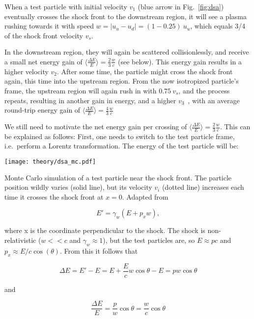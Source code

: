 When a test particle with initial velocity $v_1$ (blue arrow in Fig.~\ref{fig:dsa}) eventually crosses the shock front to the downstream region, it will see a plasma rushing towards it with speed $w=|u_u-u_d| = (1-0.25)~u_u$, which equals 3/4 of the shock front velocity $v_s$.

In the downstream region, they will again be scattered collisionlessly, and receive a small net energy gain of $\big\langle\frac{\Delta E}{E}\big\rangle = \frac{2}{3}\frac{w}{c}$ (see below). This energy gain results in a higher velocity $v_2$. After some time, the particle might cross the shock front again, this time into the upstream region. From the now isotropized particle's frame, the upstream region will again rush in with $0.75~v_s$, and the process repeats, resulting in another gain in energy, and a higher $v_3$~, with an average round-trip energy gain of $\big\langle\frac{\Delta E}{E}\big\rangle = \frac{4}{3}\frac{w}{c}$

We still need to motivate the net energy gain per crossing of $\big\langle\frac{\Delta E}{E}\big\rangle = \frac{2}{3}\frac{w}{c}$. This can be explained as follows: First, one needs to switch to the test particle frame, i.e.\ perform a Lorentz transformation. The energy of the test particle will be:

\begin{marginfigure}
    \texttt{[image: theory/dsa\_mc.pdf]}
    \caption[DSA Monte Carlo]{Monte Carlo simulation of a test particle near the shock front. The particle position wildly varies (solid line), but its velocity $v_i$ (dotted line) increases each time it crosses the shock front at $x=0$. Adapted from~\cite{Baring1997}}
\end{marginfigure}

\begin{equation}
    E' = \gamma_{w}(E+p_x w),
\end{equation}

where x is the coordinate perpendicular to the shock. The shock is non-relativistic ($w<<c$ and $\gamma_w\approx1$), but the test particles are, so $E\approx pc$ and $p_x \approx E/c \cos(\theta)$. From this it follows that

\begin{equation}
    \Delta E = E' - E = E+\frac{E}{c}w\cos{\theta}-E = pw\cos{\theta}
\end{equation}

and

\begin{equation}
    \frac{\Delta E}{E} = \frac{p}{w}\cos{\theta} = \frac{w}{c}\cos{\theta}
    \label{eqn:delta_e_over_e}
\end{equation}

